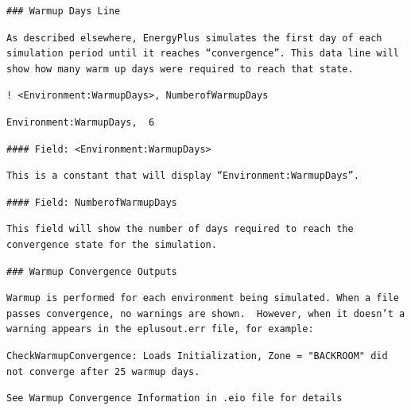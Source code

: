 \begin{lstlisting}
### Warmup Days Line
\end{lstlisting}

\begin{lstlisting}
As described elsewhere, EnergyPlus simulates the first day of each simulation period until it reaches “convergence”. This data line will show how many warm up days were required to reach that state.
\end{lstlisting}

\begin{lstlisting}
! <Environment:WarmupDays>, NumberofWarmupDays
\end{lstlisting}

\begin{lstlisting}
Environment:WarmupDays,  6
\end{lstlisting}

\begin{lstlisting}
#### Field: <Environment:WarmupDays>
\end{lstlisting}

\begin{lstlisting}
This is a constant that will display “Environment:WarmupDays”.
\end{lstlisting}

\begin{lstlisting}
#### Field: NumberofWarmupDays
\end{lstlisting}

\begin{lstlisting}
This field will show the number of days required to reach the convergence state for the simulation.
\end{lstlisting}

\begin{lstlisting}
### Warmup Convergence Outputs
\end{lstlisting}

\begin{lstlisting}
Warmup is performed for each environment being simulated. When a file passes convergence, no warnings are shown.  However, when it doesn’t a warning appears in the eplusout.err file, for example:
\end{lstlisting}

\begin{lstlisting}
CheckWarmupConvergence: Loads Initialization, Zone = "BACKROOM" did not converge after 25 warmup days.
\end{lstlisting}

\begin{lstlisting}
See Warmup Convergence Information in .eio file for details
\end{lstlisting}


